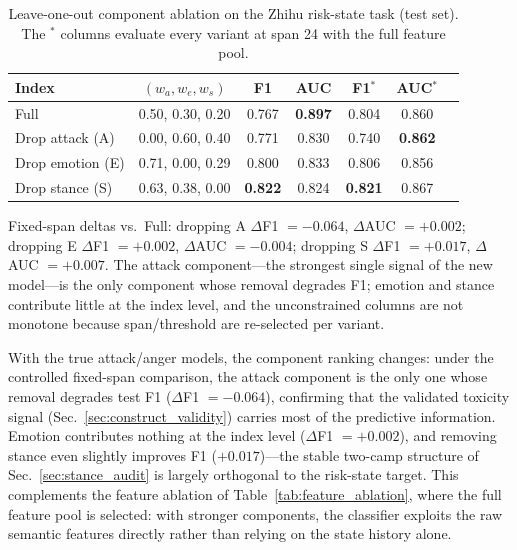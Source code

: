\documentclass[journal]{IEEEtran}
\begin{document}
\begin{table}[H]
\caption{Leave-one-out component ablation on the Zhihu risk-state task (test set). The $^{*}$ columns evaluate every variant at span 24 with the full feature pool.}\label{tab:component_ablation}
\centering
\footnotesize
\begin{threeparttable}
\begin{tabular}{lcccccc}
\toprule
\textbf{Index} & $(w_a,w_e,w_s)$ & \textbf{F1} & \textbf{AUC} & \textbf{F1$^{*}$} & \textbf{AUC$^{*}$} \\
\midrule
Full & 0.50, 0.30, 0.20 & 0.767 & \textbf{0.897} & 0.804 & 0.860 \\
Drop attack (A) & 0.00, 0.60, 0.40 & 0.771 & 0.830 & 0.740 & \textbf{0.862} \\
Drop emotion (E) & 0.71, 0.00, 0.29 & 0.800 & 0.833 & 0.806 & 0.856 \\
Drop stance (S) & 0.63, 0.38, 0.00 & \textbf{0.822} & 0.824 & \textbf{0.821} & 0.867 \\
\bottomrule
\end{tabular}
\begin{tablenotes}
\item Fixed-span deltas vs.\ Full: dropping A $\Delta$F1 $=-0.064$, $\Delta$AUC $=+0.002$; dropping E $\Delta$F1 $=+0.002$, $\Delta$AUC $=-0.004$; dropping S $\Delta$F1 $=+0.017$, $\Delta$AUC $=+0.007$. The attack component---the strongest single signal of the new model---is the only component whose removal degrades F1; emotion and stance contribute little at the index level, and the unconstrained columns are not monotone because span/threshold are re-selected per variant.
\end{tablenotes}
\end{threeparttable}
\end{table}

With the true attack/anger models, the component ranking changes: under the controlled fixed-span comparison, the attack component is the only one whose removal degrades test F1 ($\Delta$F1 $=-0.064$), confirming that the validated toxicity signal (Sec.~\ref{sec:construct_validity}) carries most of the predictive information. Emotion contributes nothing at the index level ($\Delta$F1 $=+0.002$), and removing stance even slightly improves F1 ($+0.017$)---the stable two-camp structure of Sec.~\ref{sec:stance_audit} is largely orthogonal to the risk-state target. This complements the feature ablation of Table~\ref{tab:feature_ablation}, where the full feature pool is selected: with stronger components, the classifier exploits the raw semantic features directly rather than relying on the state history alone.
\end{document}
